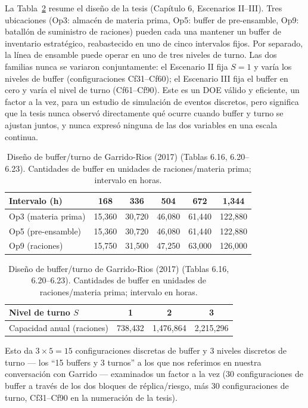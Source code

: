 \documentclass[11pt]{article}
\begin{document}
La Tabla~\ref{tab:garrido_design} resume el diseño de la tesis (Capítulo
6, Escenarios II--III). Tres ubicaciones (Op3: almacén de materia prima,
Op5: buffer de pre-ensamble, Op9: batallón de suministro de raciones)
pueden cada una mantener un buffer de inventario estratégico, reabastecido
en uno de cinco intervalos fijos. Por separado, la línea de ensamble puede
operar en uno de tres niveles de turno. Las dos familias nunca se variaron
conjuntamente: el Escenario II fija $S=1$ y varía los niveles de buffer
(configuraciones Cf31--Cf60); el Escenario III fija el buffer en cero y
varía el nivel de turno (Cf61--Cf90). Este es un DOE válido y eficiente,
un factor a la vez, para un estudio de simulación de eventos discretos,
pero significa que la tesis nunca observó directamente qué ocurre cuando
buffer y turno se ajustan juntos, y nunca expresó ninguna de las dos
variables en una escala continua.

\begin{table}[htbp]
\centering
\caption{Diseño de buffer/turno de Garrido-Rios (2017) (Tablas 6.16,
6.20--6.23). Cantidades de buffer en unidades de raciones/materia prima;
intervalo en horas.}
\label{tab:garrido_design}
\small
\begin{tabular}{lccccc}
\toprule
Intervalo (h) & 168 & 336 & 504 & 672 & 1{,}344 \\
\midrule
Op3 (materia prima) & 15{,}360 & 30{,}720 & 46{,}080 & 61{,}440 & 122{,}880 \\
Op5 (pre-ensamble) & 15{,}360 & 30{,}720 & 46{,}080 & 61{,}440 & 122{,}880 \\
Op9 (raciones) & 15{,}750 & 31{,}500 & 47{,}250 & 63{,}000 & 126{,}000 \\
\bottomrule
\end{tabular}

\vspace{0.4em}
\begin{tabular}{lccc}
\toprule
Nivel de turno $S$ & 1 & 2 & 3 \\
\midrule
Capacidad anual (raciones) & 738{,}432 & 1{,}476{,}864 & 2{,}215{,}296 \\
\bottomrule
\end{tabular}
\end{table}

Esto da $3 \times 5 = 15$ configuraciones discretas de buffer y 3 niveles
discretos de turno --- los ``15 buffers y 3 turnos'' a los que nos
referimos en nuestra conversación con Garrido --- examinados un factor a
la vez (30 configuraciones de buffer a través de los dos bloques de
réplica/riesgo, más 30 configuraciones de turno, Cf31--Cf90 en la
numeración de la tesis).
\end{document}
